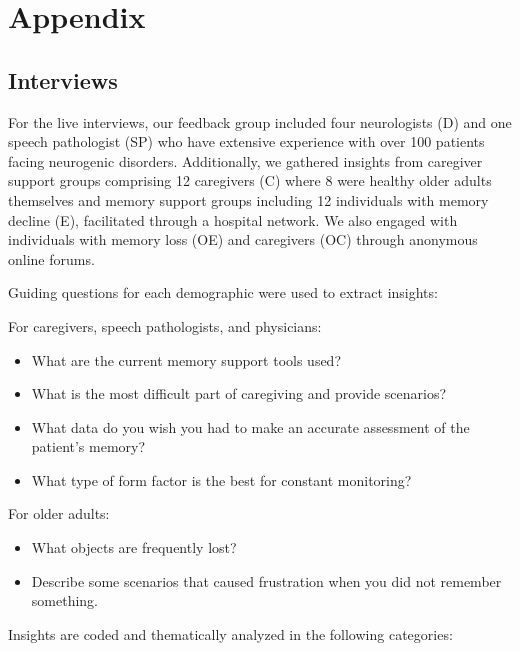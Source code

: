 \section{Appendix}  

\subsection{Interviews}\label{appendixinterviews}

For the live interviews, our feedback group included four neurologists (D) and one speech pathologist (SP) who have extensive experience with over 100 patients facing neurogenic disorders. Additionally, we gathered insights from caregiver support groups comprising 12 caregivers (C) where 8 were healthy older adults themselves and memory support groups including 12 individuals with memory decline (E), facilitated through a hospital network. We also engaged with individuals with memory loss (OE) and caregivers (OC) through anonymous online forums. 

Guiding questions for each demographic were used to extract insights: 

For caregivers, speech pathologists, and physicians: 
\begin{itemize}
    \item What are the current memory support tools used? 
    \item What is the most difficult part of caregiving and provide scenarios? 
    \item What data do you wish you had to make an accurate assessment of the patient's memory? 
    \item What type of form factor is the best for constant monitoring?
\end{itemize}


For older adults: 
\begin{itemize}
    \item What objects are frequently lost? 
    \item  Describe some scenarios that caused frustration when you did not remember something.
\end{itemize}


Insights are coded and thematically analyzed in the following categories: 







